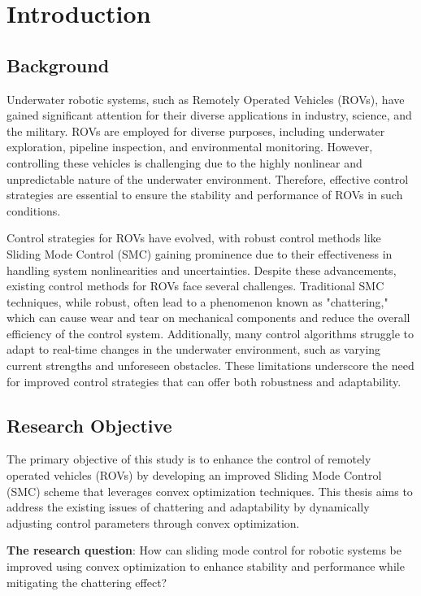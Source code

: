 \chapter{Introduction}
\label{chap:intro}

\section{Background}
    Underwater robotic systems, such as Remotely Operated Vehicles (ROVs), have gained significant attention for their diverse applications in industry, science, and the military. ROVs are employed for diverse purposes, including underwater exploration, pipeline inspection, and environmental monitoring. However, controlling these vehicles is challenging due to the highly nonlinear and unpredictable nature of the underwater environment. Therefore, effective control strategies are essential to ensure the stability and performance of ROVs in such conditions.

    Control strategies for ROVs have evolved, with robust control methods like Sliding Mode Control (SMC) gaining prominence due to their effectiveness in handling system nonlinearities and uncertainties. Despite these advancements, existing control methods for ROVs face several challenges. Traditional SMC techniques, while robust, often lead to a phenomenon known as "chattering," which can cause wear and tear on mechanical components and reduce the overall efficiency of the control system. Additionally, many control algorithms struggle to adapt to real-time changes in the underwater environment, such as varying current strengths and unforeseen obstacles. These limitations underscore the need for improved control strategies that can offer both robustness and adaptability.

\section{Research Objective}

    The primary objective of this study is to enhance the control of remotely operated vehicles (ROVs) by developing an improved Sliding Mode Control (SMC) scheme that leverages convex optimization techniques. This thesis aims to address the existing issues of chattering and adaptability by dynamically adjusting control parameters through convex optimization.

    \textbf{The research question}: 
    How can sliding mode control for robotic systems be improved using convex optimization to enhance stability and performance while mitigating the chattering effect?

